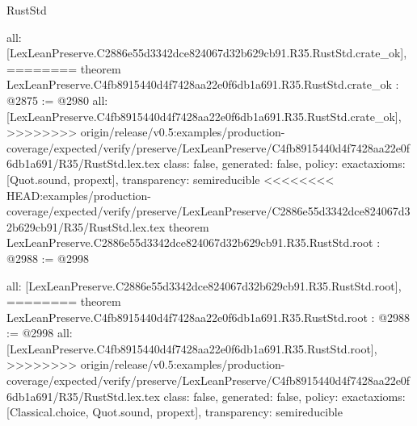 \begin{lexlean}{RustStd}
\begin{coremodule}
{\begin{coremodule}
{{{{{{  all: [LexLeanPreserve.C2886e55d3342dce824067d32b629cb91.R35.RustStd.crate_ok],
========
theorem LexLeanPreserve.C4fb8915440d4f7428aa22e0f6db1a691.R35.RustStd.crate_ok : @2875 := @2980 {
  all: [LexLeanPreserve.C4fb8915440d4f7428aa22e0f6db1a691.R35.RustStd.crate_ok],
>>>>>>>> origin/release/v0.5:examples/production-coverage/expected/verify/preserve/LexLeanPreserve/C4fb8915440d4f7428aa22e0f6db1a691/R35/RustStd.lex.tex
  class: false,
  generated: false,
  policy: exact{axioms: [Quot.sound, propext]},
  transparency: semireducible
}
<<<<<<<< HEAD:examples/production-coverage/expected/verify/preserve/LexLeanPreserve/C2886e55d3342dce824067d32b629cb91/R35/RustStd.lex.tex
theorem LexLeanPreserve.C2886e55d3342dce824067d32b629cb91.R35.RustStd.root : @2988 := @2998 {
  all: [LexLeanPreserve.C2886e55d3342dce824067d32b629cb91.R35.RustStd.root],
========
theorem LexLeanPreserve.C4fb8915440d4f7428aa22e0f6db1a691.R35.RustStd.root : @2988 := @2998 {
  all: [LexLeanPreserve.C4fb8915440d4f7428aa22e0f6db1a691.R35.RustStd.root],
>>>>>>>> origin/release/v0.5:examples/production-coverage/expected/verify/preserve/LexLeanPreserve/C4fb8915440d4f7428aa22e0f6db1a691/R35/RustStd.lex.tex
  class: false,
  generated: false,
  policy: exact{axioms: [Classical.choice, Quot.sound, propext]},
  transparency: semireducible
}

}}}}}}}
\end{coremodule}}
\end{coremodule}
\end{lexlean}
